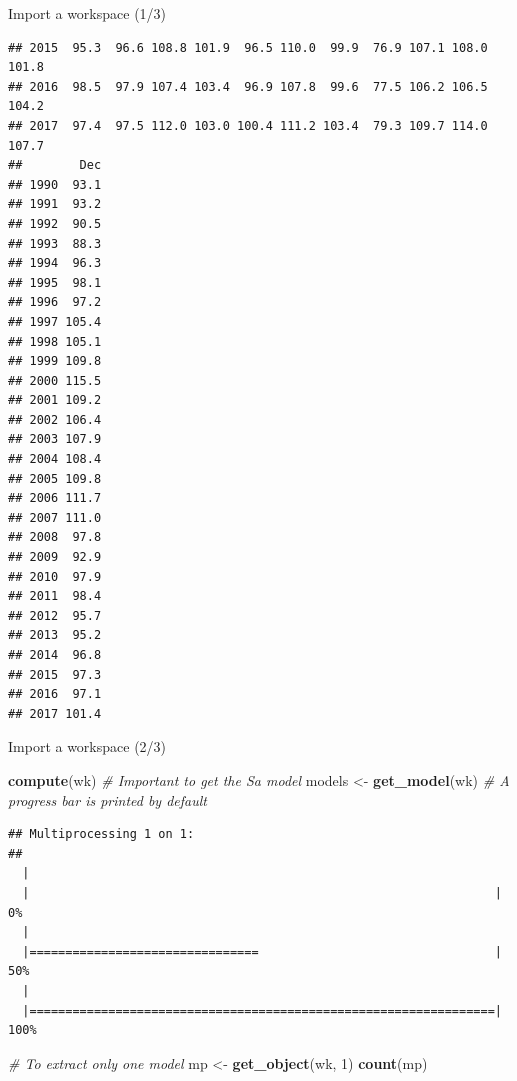 \documentclass[10pt,xcolor=table,color={dvipsnames,usenames},ignorenonframetext,usepdftitle=false,french]{beamer}
\newenvironment{Shaded}{\begin{snugshade}}{\end{snugshade}}
\newcommand{\CommentTok}[1]{\textcolor[rgb]{0.56,0.35,0.01}{\textit{#1}}}
\newcommand{\DecValTok}[1]{\textcolor[rgb]{0.00,0.00,0.81}{#1}}
\newcommand{\KeywordTok}[1]{\textcolor[rgb]{0.13,0.29,0.53}{\textbf{#1}}}
\newcommand{\NormalTok}[1]{#1}
\newcommand{\StringTok}[1]{\textcolor[rgb]{0.31,0.60,0.02}{#1}}
\begin{document}
\begin{frame}[fragile]{Import a workspace (1/3)}
\begin{verbatim}
## 2015  95.3  96.6 108.8 101.9  96.5 110.0  99.9  76.9 107.1 108.0 101.8
## 2016  98.5  97.9 107.4 103.4  96.9 107.8  99.6  77.5 106.2 106.5 104.2
## 2017  97.4  97.5 112.0 103.0 100.4 111.2 103.4  79.3 109.7 114.0 107.7
##        Dec
## 1990  93.1
## 1991  93.2
## 1992  90.5
## 1993  88.3
## 1994  96.3
## 1995  98.1
## 1996  97.2
## 1997 105.4
## 1998 105.1
## 1999 109.8
## 2000 115.5
## 2001 109.2
## 2002 106.4
## 2003 107.9
## 2004 108.4
## 2005 109.8
## 2006 111.7
## 2007 111.0
## 2008  97.8
## 2009  92.9
## 2010  97.9
## 2011  98.4
## 2012  95.7
## 2013  95.2
## 2014  96.8
## 2015  97.3
## 2016  97.1
## 2017 101.4
\end{verbatim}

\end{frame}

\begin{frame}[fragile]{Import a workspace (2/3)}
\protect\hypertarget{import-a-workspace-23}{}

\footnotesize

\begin{Shaded}
\begin{Highlighting}[]
\KeywordTok{compute}\NormalTok{(wk) }\CommentTok{# Important to get the Sa model}
\NormalTok{models <-}\StringTok{ }\KeywordTok{get_model}\NormalTok{(wk) }\CommentTok{# A progress bar is printed by default}
\end{Highlighting}
\end{Shaded}

\begin{verbatim}
## Multiprocessing 1 on 1:
## 
  |                                                                       
  |                                                                 |   0%
  |                                                                       
  |================================                                 |  50%
  |                                                                       
  |=================================================================| 100%
\end{verbatim}

\begin{Shaded}
\begin{Highlighting}[]
\CommentTok{# To extract only one model}
\NormalTok{mp <-}\StringTok{ }\KeywordTok{get_object}\NormalTok{(wk, }\DecValTok{1}\NormalTok{)}
\KeywordTok{count}\NormalTok{(mp)}
\end{Highlighting}
\end{Shaded}


\end{frame}
\end{document}
